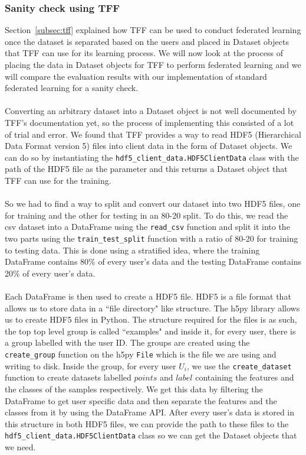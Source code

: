\documentclass[12pt]{article}
\begin{document}
\subsubsection{Sanity check using TFF}
Section~\ref{subsec:tff} explained how TFF can be used to conduct federated learning once the dataset is separated based on the users and placed in Dataset objects that TFF can use for its learning process. We will now look at the process of placing the data in Dataset objects for TFF to perform federated learning and we will compare the evaluation results with our implementation of standard federated learning for a sanity check. 
\\\\
Converting an arbitrary dataset into a Dataset object is not well documented by TFF's documentation yet, so the process of implementing this consisted of a lot of trial and error. We found that TFF provides a way to read HDF5 (Hierarchical Data Format version 5) files into client data in the form of Dataset objects. We can do so by instantiating the \texttt{hdf5\_client\_data.HDF5ClientData} class with the path of the HDF5 file as the parameter and this returns a Dataset object that TFF can use for the training.
\\\\
So we had to find a way to split and convert our dataset into two HDF5 files, one for training and the other for testing in an 80-20 split. To do this, we read the csv dataset into a DataFrame using the \texttt{read\_csv} function and split it into the two parts using the \texttt{train\_test\_split} function with a ratio of 80-20 for training to testing data. This is done using a stratified idea, where the training DataFrame contains 80\% of every user's data and the testing DataFrame contains 20\% of every user's data. 
\\\\
Each DataFrame is then used to create a HDF5 file. HDF5 is a file format that allows us to store data in a ``file directory" like structure. The h5py library allows us to create HDF5 files in Python. The structure required for the files is as such, the top top level group is called ``examples" and inside it, for every user, there is a group labelled with the user ID. The groups are created using the \texttt{create\_group} function on the h5py \texttt{File} which is the file we are using and writing to disk. Inside the group, for every user $U_i$, we use the \texttt{create\_dataset} function to create datasets labelled $points$ and $label$ containing the features and the classes of the samples respectively. We get this data by filtering the DataFrame to get user specific data and then separate the features and the classes from it by using the DataFrame API. After every user's data is stored in this structure in both HDF5 files, we can provide the path to these files to the \texttt{hdf5\_client\_data.HDF5ClientData} class so we can get the Dataset objects that we need.
\end{document}
